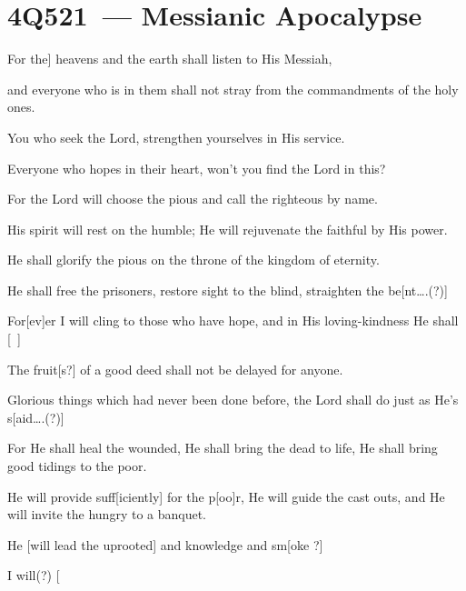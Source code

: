 \section{4Q521~--- Messianic Apocalypse}\label{dss:4q521}

\begin{inparaenum}
    {\noindent{} For the] heavens and the earth shall listen to His Messiah,}%
    
    {\noindent{} and everyone who is in them shall not stray from the commandments of the holy ones.}%
    
    {\noindent{} You who seek the Lord, strengthen yourselves in His service.}%
    
    {\noindent{} Everyone who hopes in their heart, won't you find the Lord in this?}%
    
    {\noindent{} For the Lord will choose the pious and call the righteous by name.}%
    
    {\noindent{} His spirit will rest on the humble; He will rejuvenate the faithful by His power.}%
    
    {\noindent{} He shall glorify the pious on the throne of the kingdom of eternity.}%
    
    {\noindent{} He shall free the prisoners, restore sight to the blind, straighten the be[nt\dots.(?)]}%
    
    {\noindent{} For[ev]er I will cling to those who have hope, and in His loving-kindness He shall [\ ]}%
    
    {\noindent{} The fruit[s?] of a good deed shall not be delayed for anyone.}%
    
    {\noindent{} Glorious things which had never been done before, the Lord shall do just as He's s[aid\dots.(?)]}%
    
    {\noindent{} For He shall heal the wounded, He shall bring the dead to life, He shall bring good tidings to the poor.}%
    
    {\noindent{} He will provide suff[iciently] for the p[oo]r, He will guide the cast outs, and He will invite the hungry to a banquet.}%
    
    {\noindent{} He [will lead the uprooted] and knowledge and sm[oke ?]}%
    
    {\noindent{} I will(?) [}%
\end{inparaenum}
